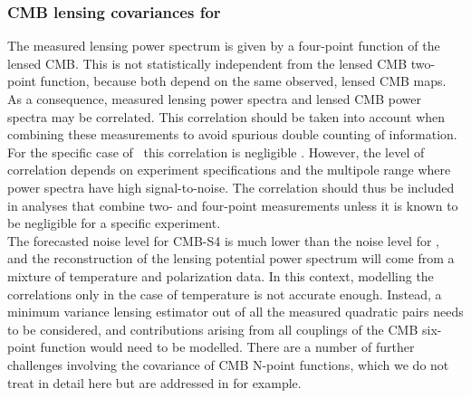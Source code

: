 \subsubsection{CMB lensing covariances for \cmbexp }
\label{se:covs}

The measured lensing power spectrum is given by a four-point function of the lensed CMB. 
This is not statistically independent from the lensed CMB two-point function, because both depend on the same observed, lensed CMB maps. 
As a consequence, measured lensing power spectra and lensed CMB power spectra may be correlated. 
This correlation should be taken into account when combining these measurements to avoid spurious double counting of information. 
For the specific case of \planck\ this correlation is negligible \cite{Schmittfull:2013uea}. 
However, the level of correlation depends on experiment specifications and the multipole range where power spectra have high signal-to-noise. 
The correlation should thus be included in analyses that combine two- and four-point measurements unless it is known to be negligible for a specific experiment.
\\

The forecasted noise level for CMB-S4 is much lower than the noise level for \planck, and the reconstruction of the lensing potential power spectrum will come from a mixture of temperature and polarization data.
In this context, modelling the correlations only in the case of temperature is not accurate enough.
Instead, a minimum variance lensing estimator out of all the measured quadratic pairs needs to be considered, and contributions arising from all couplings of the CMB six-point function would need to be modelled.
There are a number of further challenges involving the covariance of CMB N-point functions, which we do not treat in detail here but are addressed in \cite{Peloton:prep} for example. 
\\

